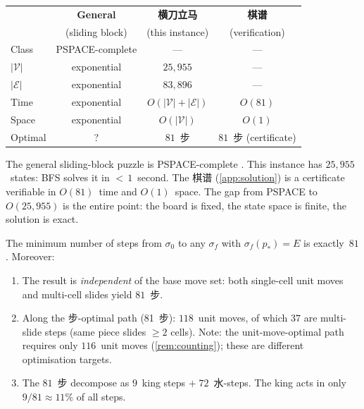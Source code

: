 \begin{remark}[Complexity]\label{rem:complexity}
\leavevmode
\begin{center}
\small
\begin{tabular}{@{}lccc@{}}
\toprule
 & \textbf{General} & \textbf{横刀立马} & \textbf{棋谱} \\
 & (sliding block) & (this instance) & (verification) \\
\midrule
Class & PSPACE-complete & --- & --- \\
$|\mathcal{V}|$ & exponential & $25{,}955$ & --- \\
$|\mathcal{E}|$ & exponential & $83{,}896$ & --- \\
Time & exponential & $O(|\mathcal{V}| + |\mathcal{E}|)$ & $O(81)$ \\
Space & exponential & $O(|\mathcal{V}|)$ & $O(1)$ \\
Optimal & ? & $81$~步 & $81$~步 (certificate) \\
\bottomrule
\end{tabular}
\end{center}
The general sliding-block puzzle is PSPACE-complete \cite{hearn}.
This instance has $25{,}955$~states:
BFS solves it in ${<}\,1$~second.
The 棋谱 (\cref{app:solution}) is a certificate
verifiable in $O(81)$~time and $O(1)$~space.
The gap from PSPACE to $O(25{,}955)$ is the entire point:
the board is fixed, the state space is finite,
the solution is exact.
\end{remark}

\begin{theorem}[81~步]\label{thm:eightyone}
The minimum number of steps from $\sigma_0$ to any
$\sigma_f$ with $\sigma_f(p_*) = E$ is exactly~$81$.
Moreover:
\begin{enumerate}[label=(\roman*)]
  \item The result is \emph{independent} of the base move
  set: both single-cell unit moves and multi-cell slides
  yield $81$~步.
  \item Along the 步-optimal path (81~步):
  $118$~unit moves, of which $37$ are multi-slide steps
  (same piece slides $\geq 2$ cells).
  Note: the unit-move-optimal path requires only $116$~unit
  moves (\cref{rem:counting}); these are different
  optimisation targets.
  \item The $81$~步 decompose as
  $9$~king steps $+\; 72$~水-steps.
  The king acts in only $9/81 \approx 11\%$ of all steps.
\end{enumerate}
\end{theorem}

